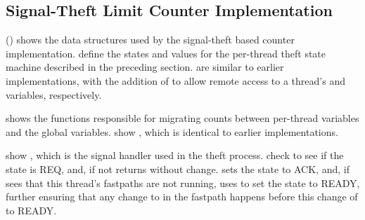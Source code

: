 \subsection{Signal-Theft Limit Counter Implementation}
\label{sec:count:Signal-Theft Limit Counter Implementation}

\begin{fcvref}
()
shows the data structures used by the signal-theft based counter
implementation.
 define the states and values
for the per-thread theft state machine
described in the preceding section.
 are similar to earlier implementations,
with the addition of
 to allow remote access to a
thread's 
and  variables, respectively.
\end{fcvref}

\begin{listing}
\caption{Signal-Theft Limit Counter Data}
\label{lst:count:Signal-Theft Limit Counter Data}
\end{listing}

\begin{fcvref}
shows the functions responsible for migrating counts between per-thread
variables and the global variables.
 show ,
which is identical to earlier
implementations.
\end{fcvref}
\begin{fcvref}
 show ,
which is the signal
handler used in the theft process.
 check to see if
the  state is REQ, and, if not
returns without change.
 sets the  state to ACK, and, if
 sees that
this thread's fastpaths are not running,  uses
 to set the 
state to READY, further ensuring that any change to  in
the fastpath happens before this change of  to READY\@.
\end{fcvref}

\begin{listing}
\caption{Signal-Theft Limit Counter Value-Migration Functions}
\label{lst:count:Signal-Theft Limit Counter Value-Migration Functions}
\end{listing}

